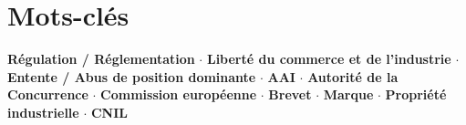 \documentclass[11pt,a4paper]{article}
\begin{document}
\section*{Mots-clés}
\textcolor{mainColor}{\textbf{Régulation / Réglementation}} $\cdot$
\textcolor{mainColor}{\textbf{Liberté du commerce et de l'industrie}} $\cdot$
\textcolor{mainColor}{\textbf{Entente / Abus de position dominante}} $\cdot$
\textcolor{mainColor}{\textbf{AAI}} $\cdot$
\textcolor{mainColor}{\textbf{Autorité de la Concurrence}} $\cdot$
\textcolor{mainColor}{\textbf{Commission européenne}} $\cdot$
\textcolor{mainColor}{\textbf{Brevet}} $\cdot$
\textcolor{mainColor}{\textbf{Marque}} $\cdot$
\textcolor{mainColor}{\textbf{Propriété industrielle}} $\cdot$
\textcolor{mainColor}{\textbf{CNIL}}
\end{document}
